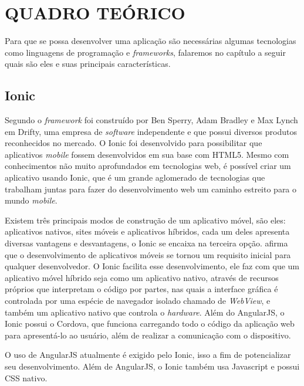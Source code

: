 \chapter{QUADRO TEÓRICO}

	\par Para que se possa desenvolver uma aplicação são necessárias algumas tecnologias como linguagens de programação e \textit{frameworks}, falaremos no capítulo a seguir quais são eles e suas principais características.

\section{Ionic}
	\par Segundo  o \textit{framework} foi construído por Ben Sperry, Adam Bradley e Max Lynch em Drifty, uma empresa de \textit{software} independente e que possui diversos produtos reconhecidos no mercado. O Ionic foi desenvolvido para possibilitar que aplicativos \textit{mobile} fossem desenvolvidos em sua base com HTML5. Mesmo com conhecimentos não muito aprofundados em tecnologias web, é possível criar um aplicativo usando Ionic, que é um grande aglomerado de tecnologias que trabalham juntas para fazer do desenvolvimento web um caminho estreito para o mundo \textit{mobile}.
	
	\par Existem três principais modos de construção de um aplicativo móvel, são eles: aplicativos nativos, sites móveis e aplicativos híbridos, cada um deles apresenta diversas vantagens e desvantagens, o Ionic se encaixa na terceira opção.  afirma que o desenvolvimento de aplicativos móveis se tornou um requisito inicial para qualquer desenvolvedor. O Ionic facilita esse desenvolvimento, ele faz com que um aplicativo móvel híbrido seja como um aplicativo nativo, através de recursos próprios que interpretam o código por partes, nas quais a interface gráfica é controlada por uma espécie de navegador isolado chamado de \textit{WebView}, e também um aplicativo nativo que controla o \textit{hardware}. Além do AngularJS, o Ionic possui o Cordova, que funciona carregando todo o código da aplicação web para apresentá-lo ao usuário, além de realizar a comunicação com o dispositivo.
	
	\par O uso de AngularJS atualmente é exigido pelo Ionic, isso a fim de potencializar seu desenvolvimento. Além de AngularJS, o Ionic também usa Javascript e possui CSS nativo.
	

